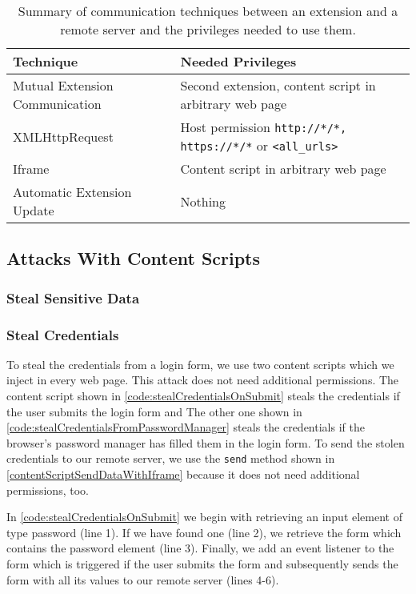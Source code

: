 	\begin{table}[h]
		\centering
		\begin{tabular}{|l|l|} \hline
			\textbf{Technique} & \textbf{Needed Privileges} \\ \hline
			Mutual Extension Communication & Second extension, content script in arbitrary web page \\
			XMLHttpRequest & Host permission \texttt{http://*/*, https://*/*} or \texttt{<all\_urls>} \\
			Iframe & Content script in arbitrary web page \\
			Automatic Extension Update & Nothing \\ 
			\hline
		\end{tabular}
		\caption{Summary of communication techniques between an extension and a remote server and the privileges needed to use them.}
		\label{tab:permissionsRemoteCommunication}
	\end{table}
	
\subsection{Attacks With Content Scripts}

\subsubsection{Steal Sensitive Data}

\subsubsection{Steal Credentials}
	
	To steal the credentials from a login form, we use two content scripts which we inject in every web page. This attack does not need additional permissions. The content script shown in \autoref{code:stealCredentialsOnSubmit} steals the credentials if the user submits the login form and The other one shown in \autoref{code:stealCredentialsFromPasswordManager} steals the credentials if the browser's password manager has filled them in the login form. To send the stolen credentials to our remote server, we use the \texttt{send} method shown in \autoref{contentScriptSendDataWithIframe} because it does not need additional permissions, too. 
	
	In \autoref{code:stealCredentialsOnSubmit} we begin with retrieving an input element of type password (line 1). If we have found one (line 2), we retrieve the form which contains the password element (line 3). Finally, we add an event listener to the form which is triggered if the user submits the form and subsequently sends the form with all its values to our remote server (lines 4-6). 
	
